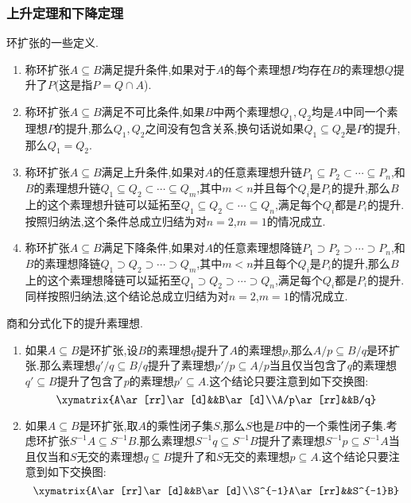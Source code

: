 \subsubsection{上升定理和下降定理}

环扩张的一些定义.
\begin{enumerate}
	\item 称环扩张$A\subseteq B$满足提升条件,如果对于$A$的每个素理想$P$均存在$B$的素理想$Q$提升了$P$(这是指$P=Q\cap A$).
	\item 称环扩张$A\subseteq B$满足不可比条件,如果$B$中两个素理想$Q_1,Q_2$均是$A$中同一个素理想$P$的提升,那么$Q_1,Q_2$之间没有包含关系,换句话说如果$Q_1\subseteq Q_2$是$P$的提升,那么$Q_1=Q_2$.
	\item 称环扩张$A\subseteq B$满足上升条件,如果对$A$的任意素理想升链$P_1\subseteq P_2\subset\cdots\subseteq P_n$,和$B$的素理想升链$Q_1\subseteq Q_2\subset\cdots\subseteq Q_m$,其中$m<n$并且每个$Q_i$是$P_i$的提升,那么$B$上的这个素理想升链可以延拓至$Q_1\subseteq Q_2\subset\cdots\subseteq Q_n$,满足每个$Q_i$都是$P_i$的提升.按照归纳法,这个条件总成立归结为对$n=2$,$m=1$的情况成立.
	\item 称环扩张$A\subseteq B$满足下降条件,如果对$A$的任意素理想降链$P_1\supset P_2\supset\cdots\supset P_n$,和$B$的素理想降链$Q_1\supset Q_2\supset\cdots\supset Q_m$,其中$m<n$并且每个$Q_i$是$P_i$的提升,那么$B$上的这个素理想降链可以延拓至$Q_1\supset Q_2\supset\cdots\supset Q_n$,满足每个$Q_i$都是$P_i$的提升.同样按照归纳法,这个结论总成立归结为对$n=2$,$m=1$的情况成立.
\end{enumerate}

商和分式化下的提升素理想.
\begin{enumerate}
	\item 如果$A\subseteq B$是环扩张,设$B$的素理想$q$提升了$A$的素理想$p$,那么$A/p\subseteq B/q$是环扩张.那么素理想$q'/q\subseteq B/q$提升了素理想$p'/p\subseteq A/p$当且仅当包含了$q$的素理想$q'\subseteq B$提升了包含了$p$的素理想$p'\subseteq A$.这个结论只要注意到如下交换图:
	$$\xymatrix{A\ar[rr]\ar[d]&&B\ar[d]\\A/p\ar[rr]&&B/q}$$
	\item 如果$A\subseteq B$是环扩张,取$A$的乘性闭子集$S$,那么$S$也是$B$中的一个乘性闭子集.考虑环扩张$S^{-1}A\subseteq S^{-1}B$.那么素理想$S^{-1}q\subseteq S^{-1}B$提升了素理想$S^{-1}p\subseteq S^{-1}A$当且仅当和$S$无交的素理想$q\subseteq B$提升了和$S$无交的素理想$p\subseteq A$.这个结论只要注意到如下交换图:
	$$\xymatrix{A\ar[rr]\ar[d]&&B\ar[d]\\S^{-1}A\ar[rr]&&S^{-1}B}$$
\end{enumerate}

